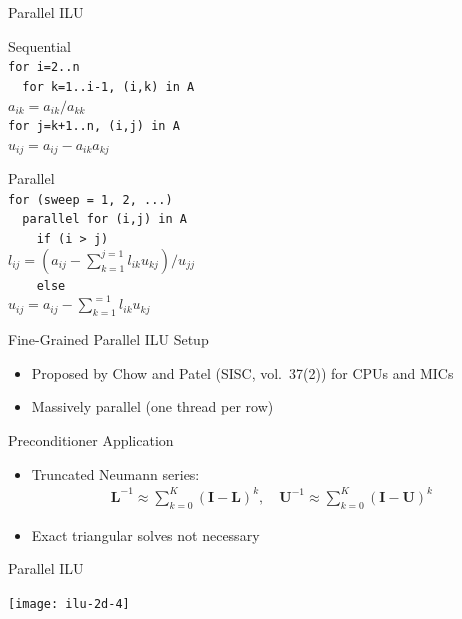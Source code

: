 \begin{frame}[fragile]{Parallel ILU}

\begin{minipage}{0.45\textwidth}
  Sequential \\
  \lstinline|for i=2..n| \\
  \lstinline|  for k=1..i-1, (i,k) in A| \\
  \hspace*{0.7cm}$a_{ik} =  a_{ik}/a_{kk}$ \\
  \hspace*{0.7cm}\lstinline|for j=k+1..n, (i,j) in A| \\
  \hspace*{1cm}$u_{ij} =  a_{ij} - a_{ik}a_{kj}$ \\
\end{minipage} \hfill
\begin{minipage}{0.5\textwidth}
  Parallel \\
  \lstinline|for (sweep = 1, 2, ...)| \\
  \lstinline|  parallel for (i,j) in A| \\
  \lstinline|    if (i > j)| \\ 
  \hspace*{1cm}$l_{ij} =  (a_{ij} - \sum_{k=1}^{j=1} l_{ik}u_{kj}) / u_{jj}$ \\
  \lstinline|    else| \\
  \hspace*{1cm}$u_{ij} =  a_{ij} - \sum_{k=1}^{=1} l_{ik}u_{kj}$
\end{minipage}


  \begin{block}{Fine-Grained Parallel ILU Setup}
   \begin{itemize}
    \item Proposed by Chow and Patel (SISC, vol.~37(2)) for CPUs and MICs
    \item Massively parallel (one thread per row)
   \end{itemize}
  \end{block}
  
  
  \begin{block}{Preconditioner Application}
   \begin{itemize}
    \item Truncated Neumann series:
     \begin{align*} \mathbf{L}^{-1} \approx \sum_{k=0}^K (\mathbf{I} - \mathbf{L})^k, \quad \mathbf{U}^{-1} \approx \sum_{k=0}^K (\mathbf{I} - \mathbf{U})^k \end{align*}
    \item Exact triangular solves not necessary
   \end{itemize}
  \end{block}

\end{frame}


\begin{frame}{Parallel ILU}
  \begin{center}
    \texttt{[image: ilu-2d-4]}
  \end{center}
\end{frame}
